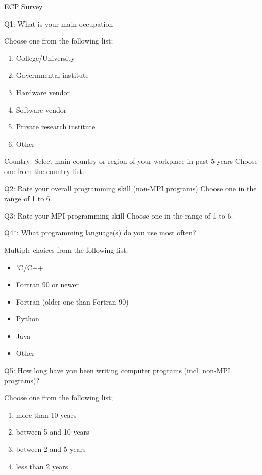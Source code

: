 
ECP Survey\cite{osti_1462877}

\begin{description}
\item{Q1:} What is your main occupation

Choose one from the following list;
\begin{enumerate}
\item College/University
\item Governmental institute
\item Hardware vendor
\item Software vendor
\item Private research institute
\item Other
\end{enumerate}

\item{Country:} Select main country or region of your workplace in past 5 years
Choose one from the country list.

\item{Q2:} Rate your overall programming skill (non-MPI programs)
Choose one in the range of 1 to 6.

\item{Q3:} Rate your MPI programming skill
Choose one in the range of 1 to 6.

\item{Q4*:} What programming language(s) do you use most often?

Multiple choices from the following list;
\begin{itemize}
\item 'C/C++
\item Fortran 90 or newer
\item Fortran (older one than Fortran 90)
\item Python
\item Java
\item Other
\end{itemize}

\item{Q5:} How long have you been writing computer programs (incl. non-MPI programs)?

Choose one from the following list;
\begin{enumerate}
\item more than 10 years
\item between 5 and 10 years
\item between 2 and 5 years
\item less than 2 years
\end{enumerate}


\end{description}
